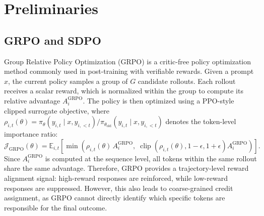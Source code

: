 \documentclass{article}
\begin{document}
\section{Preliminaries}

\subsection{GRPO and SDPO}

Group Relative Policy Optimization (GRPO) is a critic-free policy optimization method commonly used in post-training with verifiable rewards. Given a prompt $x$, the current policy samples a group of $G$ candidate rollouts. Each rollout receives a scalar reward, which is normalized within the group to compute its relative advantage $A_i^{\mathrm{GRPO}}$. The policy is then optimized using a PPO-style clipped surrogate objective, where $\rho_{i,t}(\theta)=\pi_\theta(y_{i,t}\mid x,y_{i,<t})/\pi_{\theta_{\mathrm{old}}}(y_{i,t}\mid x,y_{i,<t})$ denotes the token-level importance ratio:
\begin{equation}
\label{eq:grpo}
\mathcal{J}_{\mathrm{GRPO}}(\theta)=\mathbb{E}_{i,t}\left[\min\left(\rho_{i,t}(\theta)\,A_i^{\mathrm{GRPO}},\;\operatorname{clip}\left(\rho_{i,t}(\theta),1-\epsilon,1+\epsilon\right)A_i^{\mathrm{GRPO}}\right)\right].
\end{equation}
Since $A_i^{\mathrm{GRPO}}$ is computed at the sequence level, all tokens within the same rollout share the same advantage. Therefore, GRPO provides a trajectory-level reward alignment signal: high-reward responses are reinforced, while low-reward responses are suppressed. However, this also leads to coarse-grained credit assignment, as GRPO cannot directly identify which specific tokens are responsible for the final outcome.
\end{document}
